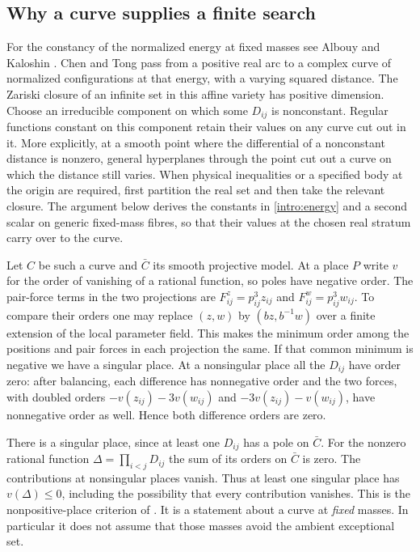 \documentclass[11pt,letterpaper]{article}
\theoremstyle{definition}
\begin{document}
\subsection{Why a curve supplies a finite search}
For the constancy of the normalized energy at fixed masses see Albouy and Kaloshin \cite[Lemma~2]{AK}. Chen and Tong \cite[Lemmas~2.1--2.2]{CT} pass from a positive real arc to a complex curve of normalized configurations at that energy, with a varying squared distance. The Zariski closure of an infinite set in this affine variety has positive dimension. Choose an irreducible component on which some $D_{ij}$ is nonconstant. Regular functions constant on this component retain their values on any curve cut out in it. More explicitly, at a smooth point where the differential of a nonconstant distance is nonzero, general hyperplanes through the point cut out a curve on which the distance still varies. When physical inequalities or a specified body at the origin are required, first partition the real set and then take the relevant closure. The argument below derives the constants in \eqref{intro:energy} and a second scalar on generic fixed-mass fibres, so that their values at the chosen real stratum carry over to the curve.

Let $C$ be such a curve and $\bar C$ its smooth projective model. At a place $P$ write $v$ for the order of vanishing of a rational function, so poles have negative order. The pair-force terms in the two projections are $F^z_{ij}=p_{ij}^3 z_{ij}$ and $F^w_{ij}=p_{ij}^3 w_{ij}$. To compare their orders one may replace $(z,w)$ by $(bz,b^{-1}w)$ over a finite extension of the local parameter field. This makes the minimum order among the positions and pair forces in each projection the same. If that common minimum is negative we have a singular place. At a nonsingular place all the $D_{ij}$ have order zero: after balancing, each difference has nonnegative order and the two forces, with doubled orders $-v(z_{ij})-3v(w_{ij})$ and $-3v(z_{ij})-v(w_{ij})$, have nonnegative order as well. Hence both difference orders are zero.

There is a singular place, since at least one $D_{ij}$ has a pole on $\bar C$. For the nonzero rational function $\Delta=\prod_{i<j}D_{ij}$ the sum of its orders on $\bar C$ is zero. The contributions at nonsingular places vanish. Thus at least one singular place has $v(\Delta)\le0$, including the possibility that every contribution vanishes. This is the nonpositive-place criterion of \cite[Corollary 2.7]{Tomar}. It is a statement about a curve at \emph{fixed} masses. In particular it does not assume that those masses avoid the ambient exceptional set.
\end{document}
